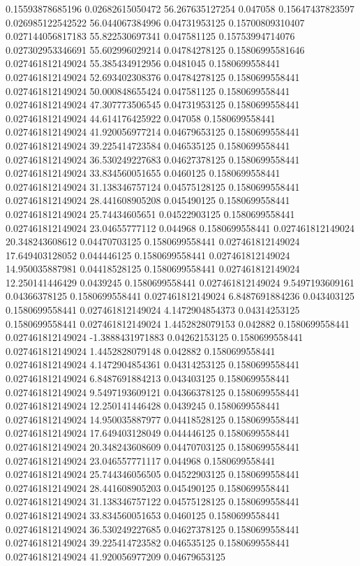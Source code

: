 0.15593878685196 0.02682615050472 56.267635127254 0.047058
0.15647437823597 0.026985122542522 56.044067384996 0.04731953125
0.15700809310407 0.027144056817183 55.822530697341 0.047581125
0.15753994714076 0.027302953346691 55.602996029214 0.04784278125
0.15806995581646 0.027461812149024 55.385434912956 0.0481045
0.1580699558441 0.027461812149024 52.693402308376 0.04784278125
0.1580699558441 0.027461812149024 50.000848655424 0.047581125
0.1580699558441 0.027461812149024 47.307773506545 0.04731953125
0.1580699558441 0.027461812149024 44.614176425922 0.047058
0.1580699558441 0.027461812149024 41.920056977214 0.04679653125
0.1580699558441 0.027461812149024 39.225414723584 0.046535125
0.1580699558441 0.027461812149024 36.530249227683 0.04627378125
0.1580699558441 0.027461812149024 33.834560051655 0.0460125
0.1580699558441 0.027461812149024 31.138346757124 0.04575128125
0.1580699558441 0.027461812149024 28.441608905208 0.045490125
0.1580699558441 0.027461812149024 25.74434605651 0.04522903125
0.1580699558441 0.027461812149024 23.04655777112 0.044968
0.1580699558441 0.027461812149024 20.348243608612 0.04470703125
0.1580699558441 0.027461812149024 17.649403128052 0.044446125
0.1580699558441 0.027461812149024 14.950035887981 0.04418528125
0.1580699558441 0.027461812149024 12.250141446429 0.0439245
0.1580699558441 0.027461812149024 9.5497193609161 0.04366378125
0.1580699558441 0.027461812149024 6.8487691884236 0.043403125
0.1580699558441 0.027461812149024 4.1472904854373 0.04314253125
0.1580699558441 0.027461812149024 1.4452828079153 0.042882
0.1580699558441 0.027461812149024 -1.3888431971883 0.04262153125
0.1580699558441 0.027461812149024 1.4452828079148 0.042882
0.1580699558441 0.027461812149024 4.1472904854361 0.04314253125
0.1580699558441 0.027461812149024 6.8487691884213 0.043403125
0.1580699558441 0.027461812149024 9.5497193609121 0.04366378125
0.1580699558441 0.027461812149024 12.250141446428 0.0439245
0.1580699558441 0.027461812149024 14.950035887977 0.04418528125
0.1580699558441 0.027461812149024 17.649403128049 0.044446125
0.1580699558441 0.027461812149024 20.348243608609 0.04470703125
0.1580699558441 0.027461812149024 23.046557771117 0.044968
0.1580699558441 0.027461812149024 25.744346056505 0.04522903125
0.1580699558441 0.027461812149024 28.441608905203 0.045490125
0.1580699558441 0.027461812149024 31.138346757122 0.04575128125
0.1580699558441 0.027461812149024 33.834560051653 0.0460125
0.1580699558441 0.027461812149024 36.530249227685 0.04627378125
0.1580699558441 0.027461812149024 39.225414723582 0.046535125
0.1580699558441 0.027461812149024 41.920056977209 0.04679653125
